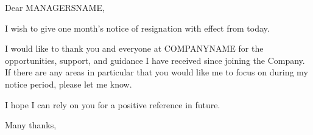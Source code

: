 \documentclass{letter}
\date{\displaydate{date}}
\begin{document}
\begin{letter}{}
\opening{Dear MANAGERSNAME,}

I wish to give one month's notice of resignation with effect from today.

I would like to thank you and everyone at COMPANYNAME for the opportunities,
support, and guidance I have received since joining the Company. If there are
any areas in particular that you would like me to focus on during my notice
period, please let me know.

I hope I can rely on you for a positive reference in future.

\closing{Many thanks,}

\end{letter}
\end{document}
